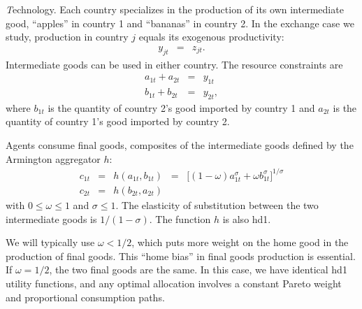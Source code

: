 {\textit Technology.\/}
Each country specializes in the production of its own intermediate good,
``apples'' in country 1 and ``bananas'' in country 2.
In the exchange case we study, production in country $j$ equals its exogenous productivity:
\begin{eqnarray}
    y_{jt} &=&  z_{jt} .
            \label{eq:production}
\end{eqnarray}
Intermediate goods can be used in either country.
The  resource constraints are
\begin{eqnarray}
    a_{1t} + a_{2t} &=& y_{1t}
            \label{eq:resource-a} \\
    b_{1t} + b_{2t} &=& y_{2t}  ,
            \label{eq:resource-b}
\end{eqnarray}
where $b_{1t}$ is the quantity of country 2's good imported by country 1
and $a_{2t}$ is the quantity of country 1's good imported by country 2.

Agents consume final goods, composites of the intermediate goods defined by the
Armington aggregator $h$:
\begin{eqnarray}
    c_{1t} &=& h (a_{1t}, b_{1t} )
            \;\;=\;\; \big[(1-\omega) a_{1t}^{\sigma} + \omega b_{1t}^{\sigma}\big]^{1/\sigma}
            \label{eq:armington-1} \\
    c_{2t} &=& h (b_{2t} , a_{2t})
            \label{eq:armington-2}
\end{eqnarray}
with $ 0 \leq \omega \leq 1$ and $\sigma \leq 1$.
The elasticity of substitution between the two intermediate goods is $1/(1-\sigma)$.
The function $h$ is also hd1.

We will typically use $\omega < 1/2 $, which puts more weight on the home good
in the production of final goods.
This ``home bias'' in final goods production is essential.
If $\omega = 1/2$, the two final goods are the same.
In this case, we have identical hd1 utility functions,
and any optimal allocation
involves a constant Pareto weight and proportional consumption paths.

